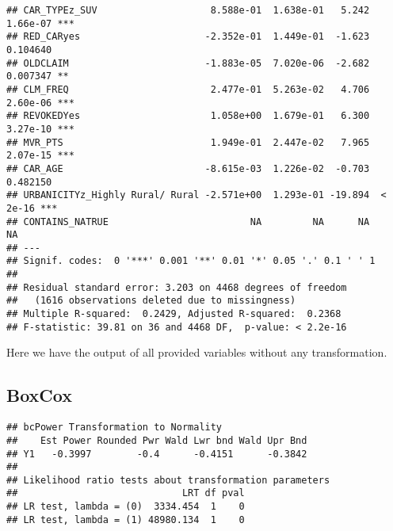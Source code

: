 \documentclass[]{article}
\begin{document}
\begin{verbatim}
## CAR_TYPEz_SUV                    8.588e-01  1.638e-01   5.242 1.66e-07 ***
## RED_CARyes                      -2.352e-01  1.449e-01  -1.623 0.104640    
## OLDCLAIM                        -1.883e-05  7.020e-06  -2.682 0.007347 ** 
## CLM_FREQ                         2.477e-01  5.263e-02   4.706 2.60e-06 ***
## REVOKEDYes                       1.058e+00  1.679e-01   6.300 3.27e-10 ***
## MVR_PTS                          1.949e-01  2.447e-02   7.965 2.07e-15 ***
## CAR_AGE                         -8.615e-03  1.226e-02  -0.703 0.482150    
## URBANICITYz_Highly Rural/ Rural -2.571e+00  1.293e-01 -19.894  < 2e-16 ***
## CONTAINS_NATRUE                         NA         NA      NA       NA    
## ---
## Signif. codes:  0 '***' 0.001 '**' 0.01 '*' 0.05 '.' 0.1 ' ' 1
## 
## Residual standard error: 3.203 on 4468 degrees of freedom
##   (1616 observations deleted due to missingness)
## Multiple R-squared:  0.2429, Adjusted R-squared:  0.2368 
## F-statistic: 39.81 on 36 and 4468 DF,  p-value: < 2.2e-16
\end{verbatim}

Here we have the output of all provided variables without any
transformation.

\hypertarget{boxcox}{%
\subsection{BoxCox}\label{boxcox}}

\begin{verbatim}
## bcPower Transformation to Normality 
##    Est Power Rounded Pwr Wald Lwr bnd Wald Upr Bnd
## Y1   -0.3997        -0.4      -0.4151      -0.3842
## 
## Likelihood ratio tests about transformation parameters
##                             LRT df pval
## LR test, lambda = (0)  3334.454  1    0
## LR test, lambda = (1) 48980.134  1    0
\end{verbatim}
\end{document}
